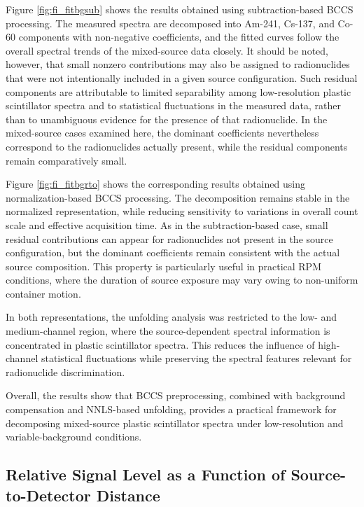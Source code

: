 \documentclass[10pt]{wlscirep}
\begin{document}
Figure \ref{fig:fi_fitbgsub} shows the results obtained using subtraction-based BCCS processing. The measured spectra are decomposed into Am-241, Cs-137, and Co-60 components with non-negative coefficients, and the fitted curves follow the overall spectral trends of the mixed-source data closely. It should be noted, however, that small nonzero contributions may also be assigned to radionuclides that were not intentionally included in a given source configuration. Such residual components are attributable to limited separability among low-resolution plastic scintillator spectra and to statistical fluctuations in the measured data, rather than to unambiguous evidence for the presence of that radionuclide. In the mixed-source cases examined here, the dominant coefficients nevertheless correspond to the radionuclides actually present, while the residual components remain comparatively small.

Figure \ref{fig:fi_fitbgrto} shows the corresponding results obtained using normalization-based BCCS processing. The decomposition remains stable in the normalized representation, while reducing sensitivity to variations in overall count scale and effective acquisition time. As in the subtraction-based case, small residual contributions can appear for radionuclides not present in the source configuration, but the dominant coefficients remain consistent with the actual source composition. This property is particularly useful in practical RPM conditions, where the duration of source exposure may vary owing to non-uniform container motion.

In both representations, the unfolding analysis was restricted to the low- and medium-channel region, where the source-dependent spectral information is concentrated in plastic scintillator spectra. This reduces the influence of high-channel statistical fluctuations while preserving the spectral features relevant for radionuclide discrimination.

Overall, the results show that BCCS preprocessing, combined with background compensation and NNLS-based unfolding, provides a practical framework for decomposing mixed-source plastic scintillator spectra under low-resolution and variable-background conditions.


\subsection*{Relative Signal Level as a Function of Source-to-Detector Distance}
\end{document}
